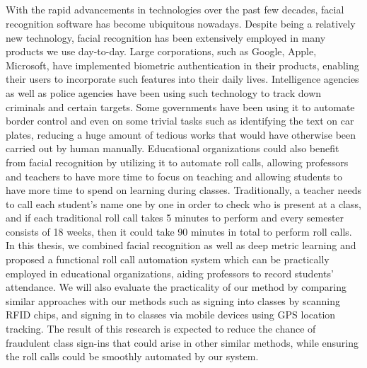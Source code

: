 \begin{center}
  \section*{\abstractname}
\end{center}
\large

With the rapid advancements in technologies over the past few decades, facial recognition software has become
ubiquitous nowadays. Despite being a relatively new technology, facial recognition has been
extensively employed in many products we use day-to-day. Large corporations, such as Google, Apple, Microsoft, 
have implemented biometric authentication in their products, enabling their users to incorporate
such features into their daily lives. Intelligence agencies as well as police agencies have been using
such technology to track down criminals and certain targets. Some governments have been using it to automate
border control and even on some trivial tasks such as identifying the text on car plates, reducing a huge amount
of tedious works that would have otherwise been carried out by human manually. Educational organizations
could also benefit from facial recognition by utilizing it to automate roll calls, allowing professors and teachers
to have more time to focus on teaching and allowing students to have more time to spend on learning during classes.
Traditionally, a teacher needs to call each student's name one by one in order to check who is present at a class,
and if each traditional roll call takes 5 minutes to perform and every semester consists of 18 weeks, then
it could take 90 minutes in total to perform roll calls. In this thesis, we combined facial recognition as well as
deep metric learning and proposed a functional roll call automation system which can be practically employed in
educational organizations,  aiding professors to record students' attendance. We will also evaluate the practicality
of our method by comparing similar approaches with our methods such as signing into classes by scanning RFID chips,
and signing in to classes via mobile devices using GPS location tracking. The result of this research is expected to
reduce the chance of fraudulent class sign-ins that could arise in other similar methods, while ensuring the roll calls
could be smoothly automated by our system.
\newpage
